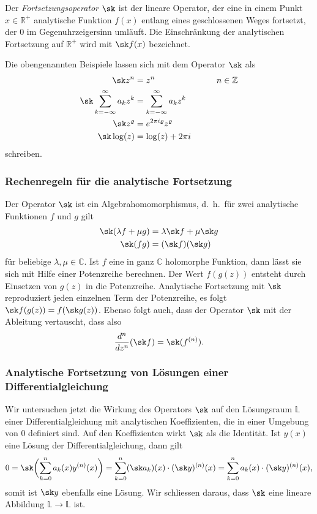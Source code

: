 \begin{definition}
\label{buch:funktionentheorie:def:fortsetzungsoperator}
%
Der {\em Fortsetzungsoperator} $\sk$ ist der lineare Operator, der eine
in einem Punkt $x\in\mathbb{R}^+$ analytische Funktion $f(x)$ entlang eines
geschlossenen Weges fortsetzt, der $0$ im Gegenuhrzeigersinn umläuft.
Die Einschränkung der analytischen Fortsetzung auf $\mathbb{R}^+$ wird
mit $\sk f(x)$ bezeichnet.
%
%
\end{definition}

Die obengenannten Beispiele lassen sich mit dem Operator $\sk$ als
\[
\begin{aligned}
\sk z^n
&=
z^n
&\qquad& n \in \mathbb{Z}
\\
\sk
\sum_{k=-\infty}^\infty a_kz^k
&=
\sum_{k=-\infty}^\infty a_kz^k
\\
\sk z^\varrho
&=
e^{2\pi i\varrho} z^\varrho
\\
\sk \log(z)
&=
\log(z) + 2\pi i
\end{aligned}
\]
schreiben.

%
%
\subsubsection{Rechenregeln für die analytische Fortsetzung}
Der Operator $\sk$ ist ein Algebrahomomorphismus, d.~h.~für zwei analytische
Funktionen $f$ und $g$ gilt
\[
\begin{aligned}
\sk(\lambda f + \mu g)
&=
\lambda \sk f  + \mu \sk g
\\
\sk(fg)
&=
(\sk f)(\sk g)
\end{aligned}
\]
für beliebige $\lambda,\mu\in\mathbb{C}$.
Ist $f$ eine in ganz $\mathbb{C}$ holomorphe Funktion, dann lässt sie
sich mit Hilfe einer Potenzreihe berechnen.
Der Wert $f(g(z))$ entsteht durch Einsetzen von $g(z)$ in die Potenzreihe.
Analytische Fortsetzung mit $\sk$ reproduziert jeden einzelnen Term
der Potenzreihe, es folgt
$\sk f(g(z)) = f(\sk g(z))$.
Ebenso folgt auch, dass der Operator $\sk$ mit der Ableitung
vertauscht, dass also
\[
\frac{d^n}{dz^n}(\sk f)
=
\sk(f^{(n)}).
\]

%
%
\subsubsection{Analytische Fortsetzung von Lösungen einer Differentialgleichung}
Wir untersuchen jetzt die Wirkung des Operators $\sk$ auf
den Lösungsraum $\mathbb{L}$ einer Differentialgleichung mit
analytischen Koeffizienten, die in einer Umgebung von $0$
definiert sind.
Auf den Koeffizienten wirkt $\sk$ als die Identität. 
Ist $y(x)$ eine Lösung der Differentialgleichung, dann gilt
\[
0
=
\sk\biggl(
\sum_{k=0}^n a_k(x) y^{(n)}(x)
\biggr)
=
\sum_{k=0}^n (\sk a_k)(x) \cdot (\sk y)^{(n)}(x)
=
\sum_{k=0}^n a_k(x) \cdot (\sk y)^{(n)}(x),
\]
somit ist $\sk y$ ebenfalls eine Lösung.
Wir schliessen daraus, dass $\sk$ eine lineare Abbildung 
$\mathbb{L}\to\mathbb{L}$ ist.

